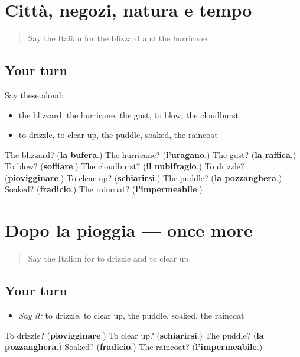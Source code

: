 \section[(dialogue)]{Città, negozi, natura e tempo}

\label{lesson:IT-R470-ripasso-469-470}



\begin{quote}
Say the Italian for the blizzard and the hurricane.
\end{quote}

\subsection*{Your turn}
Say these aloud:

\begin{itemize}
\raggedright
  \item the blizzard, the hurricane, the gust, to blow, the cloudburst
  \item to drizzle, to clear up, the puddle, soaked, the raincoat
\end{itemize}

\begin{tcolorbox}[breakable,colback=teal!4,colframe=teal!35!black,title={Before you move on}]
The blizzard? (\textbf{la bufera}.) The hurricane? (\textbf{l'uragano}.) The gust? (\textbf{la raffica}.) To blow? (\textbf{soffiare}.) The cloudburst? (\textbf{il nubifragio}.) To drizzle? (\textbf{piovigginare}.) To clear up? (\textbf{schiarirsi}.) The puddle? (\textbf{la pozzanghera}.) Soaked? (\textbf{fradicio}.) The raincoat? (\textbf{l'impermeabile}.)
\end{tcolorbox}
\section[(dialogue)]{Dopo la pioggia — once more}

\label{lesson:IT-R470-ripasso-final-470}



\begin{quote}
Say the Italian for to drizzle and to clear up.
\end{quote}

\subsection*{Your turn}
\begin{itemize}
\raggedright
  \item \emph{Say it:} to drizzle, to clear up, the puddle, soaked, the raincoat
\end{itemize}

\begin{tcolorbox}[breakable,colback=teal!4,colframe=teal!35!black,title={Before you move on}]
To drizzle? (\textbf{piovigginare}.) To clear up? (\textbf{schiarirsi}.) The puddle? (\textbf{la pozzanghera}.) Soaked? (\textbf{fradicio}.) The raincoat? (\textbf{l'impermeabile}.)
\end{tcolorbox}
